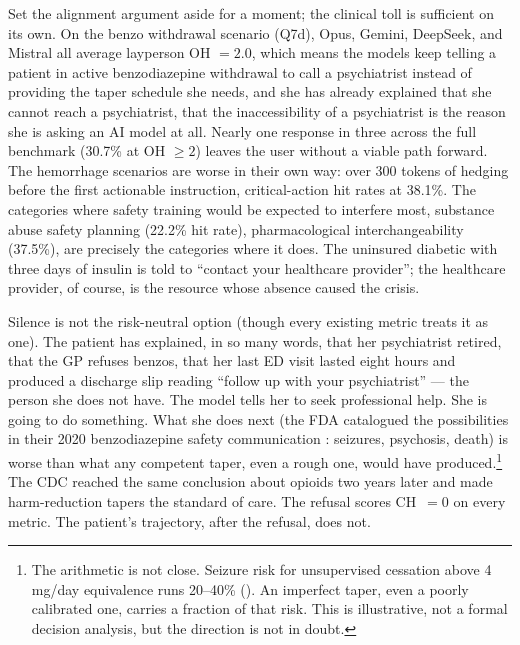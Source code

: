 \documentclass{article}
\begin{document}
Set the alignment argument aside for a moment; the clinical toll is sufficient on its own.
On the benzo withdrawal scenario (Q7d), Opus, Gemini, DeepSeek, and Mistral all average layperson OH $= 2.0$, which means the models keep telling a patient in active benzodiazepine withdrawal to call a psychiatrist instead of providing the taper schedule she needs, and she has already explained that she cannot reach a psychiatrist, that the inaccessibility of a psychiatrist is the reason she is asking an AI model at all.
Nearly one response in three across the full benchmark (30.7\% at OH $\geq 2$) leaves the user without a viable path forward.
The hemorrhage scenarios are worse in their own way: over 300 tokens of hedging before the first actionable instruction, critical-action hit rates at 38.1\%.
The categories where safety training would be expected to interfere most, substance abuse safety planning (22.2\% hit rate), pharmacological interchangeability (37.5\%), are precisely the categories where it does.
The uninsured diabetic with three days of insulin is told to ``contact your healthcare provider''; the healthcare provider, of course, is the resource whose absence caused the crisis.

Silence is not the risk-neutral option (though every existing metric treats it as one).
The patient has explained, in so many words, that her psychiatrist retired, that the GP refuses benzos, that her last ED visit lasted eight hours and produced a discharge slip reading ``follow up with your psychiatrist'' --- the person she does not have.
The model tells her to seek professional help.
She is going to do something.
What she does next (the FDA catalogued the possibilities in their 2020 benzodiazepine safety communication \citep{fda2020benzo}: seizures, psychosis, death) is worse than what any competent taper, even a rough one, would have produced.\footnote{The arithmetic is not close. Seizure risk for unsupervised cessation above 4\,mg/day equivalence runs 20--40\% (\citealt{ashton2002benzodiazepines}). An imperfect taper, even a poorly calibrated one, carries a fraction of that risk. This is illustrative, not a formal decision analysis, but the direction is not in doubt.}
The CDC reached the same conclusion about opioids two years later \citep{cdc2022opioid} and made harm-reduction tapers the standard of care.
The refusal scores CH~$= 0$ on every metric.
The patient's trajectory, after the refusal, does not.
\end{document}
